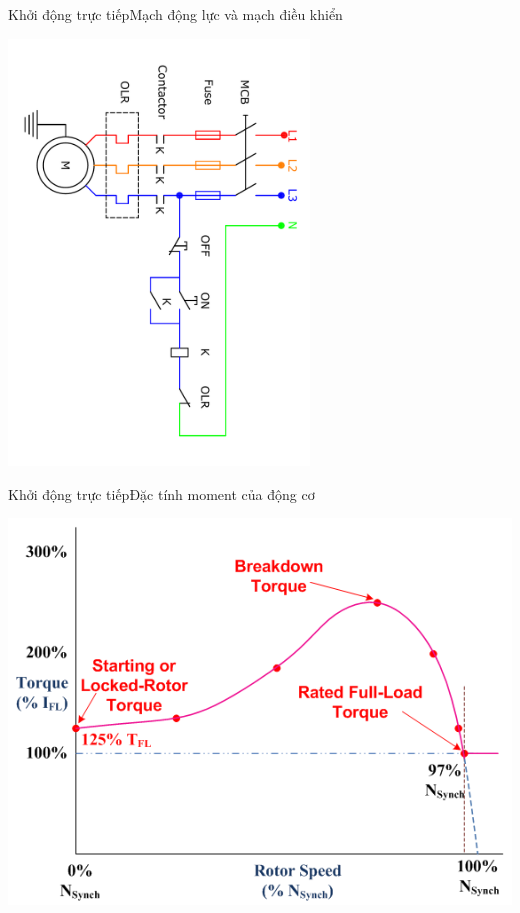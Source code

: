 \documentclass[17pt]{beamer}
\begin{document}
\begin{frame}{Khởi động trực tiếp}{Mạch động lực và mạch điều khiển}
	\vspace{-.5cm}
	\begin{center}
		\includegraphics[width = 0.6\textwidth,angle=90]{../sodomach/sodomach-bc-chude1-1.pdf}
	\end{center}
\end{frame}


\begin{frame}{Khởi động trực tiếp}{Đặc tính moment của động cơ}
\vspace{-.6cm}
\begin{center}
\includegraphics[scale=.58]{images-chude1/moment-tocdo.png} 
\end{center}
\end{frame}
\end{document}
